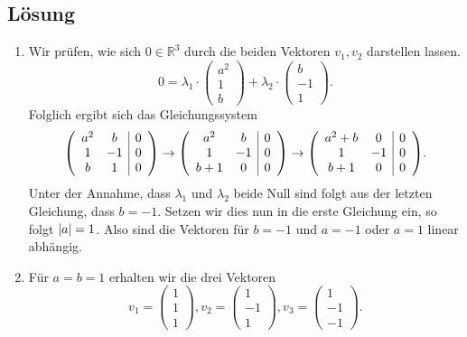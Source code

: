 \documentclass[german,12pt]{homework}
\newcommand{\RR}{\mathbb{R}}
\DeclarePairedDelimiter{\absolute}{\lvert}{\rvert}
\DeclarePairedDelimiter{\enbrace}{(}{)}
\begin{document}
    \subsection*{Lösung}
    \begin{enumerate}
        \item Wir prüfen, wie sich \(0 \in \RR^3\) durch die beiden Vektoren
        \(v_1, v_2\) darstellen lassen.
        \[0 = \lambda_1 \cdot \begin{pmatrix}a^2\\1\\b\end{pmatrix} + \lambda_2
        \cdot \begin{pmatrix}b\\-1\\1\end{pmatrix}.\]
        Folglich ergibt sich das Gleichungssystem
        \[\enbrace*{\begin{array}{cc|c}
            a^2 & b & 0\\
            1 & -1 & 0\\
            b & 1 & 0
        \end{array}} \to \enbrace*{\begin{array}{cc|c}
            a^2 & b & 0\\
            1 & -1 & 0\\
            b + 1 & 0 & 0
        \end{array}} \to \enbrace*{\begin{array}{cc|c}
            a^2 + b & 0 & 0\\
            1 & -1 & 0\\
            b + 1 & 0 & 0
        \end{array}}.\]
        Unter der Annahme, dass \(\lambda_1\) und \(\lambda_2\) beide Null sind
        folgt aus der letzten Gleichung, dass \(b = -1\). Setzen wir dies nun
        in die erste Gleichung ein, so folgt \(\absolute*{a} = 1\). Also sind
        die Vektoren für \(b = -1\) und \(a = -1\) oder \(a = 1\) linear
        abhängig.
        \item Für \(a = b = 1\) erhalten wir die drei Vektoren
        \[v_1 = \begin{pmatrix}1\\1\\1\end{pmatrix}, v_2 = \begin{pmatrix}1\\-
        1\\1\end{pmatrix}, v_3 = \begin{pmatrix}1\\-1\\-1\end{pmatrix}.\]

\end{enumerate}
\end{document}
